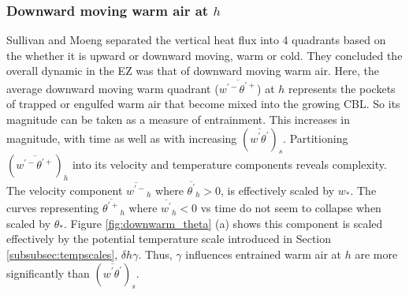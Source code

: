 \subsubsection{Downward moving warm air at $h$}
\label{subsubsec:downwarm}

Sullivan and Moeng separated the vertical heat flux into 4 quadrants based on the whether it is upward or downward moving, warm or cold. They concluded the overall dynamic in the EZ was that of downward moving warm air. Here, the average downward moving warm quadrant ($\overline{w^{'-}\theta^{'+}}$) at $h$ represents the pockets of trapped or engulfed warm air that become mixed into the growing CBL.  So its magnitude can be taken as a measure of entrainment.  This increases in magnitude, with time as well as with increasing $(\overline{w^{'}\theta^{'}})_{s}$.  Partitioning $(\overline{w^{'-}\theta^{'+}})_{h}$ into its velocity and temperature components reveals complexity.  The velocity component $\overline{w^{'-}}_{h}$  where $ \overline{\theta^{'}}_{h}>0$, is effectively scaled by $w_{*}$.  The curves representing $\overline{\theta^{'+}}_{h}$ where $\overline{w^{'}}_{h}<0$ vs time do not seem to collapse when scaled by $\theta_{*}$.  Figure \ref{fig:downwarm_theta} (a) shows this component is scaled effectively by the potential temperature scale introduced in Section \ref{subsubsec:tempscales}, $\delta h \gamma$.  Thus, $\gamma$ influences entrained warm air at $h$ are more significantly than $(\overline{w^{'}\theta^{'}})_{s}$.\\ 
\\   

